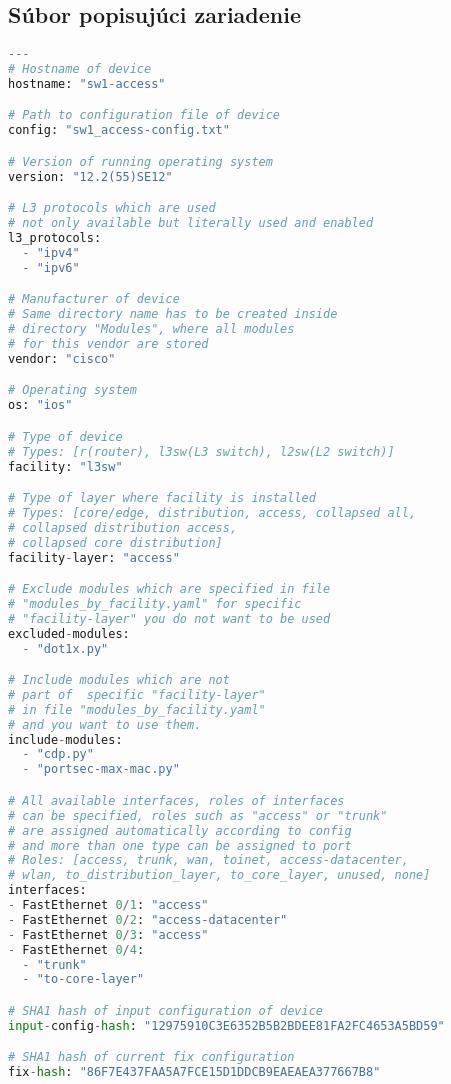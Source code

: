 \subsection{Súbor popisujúci zariadenie}
\begin{lstlisting}[frame=single,numbers=right,caption={Konfiguračný súbor device.yaml, ktorý popisuje základné informácie o~jednom konkrétnom zariadení},label=lst:lldp,basicstyle=\ttfamily\small, keywordstyle=\color{black},language=python,breaklines=true]
---
# Hostname of device
hostname: "sw1-access"

# Path to configuration file of device
config: "sw1_access-config.txt"

# Version of running operating system
version: "12.2(55)SE12"

# L3 protocols which are used 
# not only available but literally used and enabled
l3_protocols:
  - "ipv4"
  - "ipv6"

# Manufacturer of device
# Same directory name has to be created inside 
# directory "Modules", where all modules 
# for this vendor are stored
vendor: "cisco"

# Operating system
os: "ios"

# Type of device
# Types: [r(router), l3sw(L3 switch), l2sw(L2 switch)]
facility: "l3sw"

# Type of layer where facility is installed
# Types: [core/edge, distribution, access, collapsed all, 
# collapsed distribution access, 
# collapsed core distribution]
facility-layer: "access"

# Exclude modules which are specified in file 
# "modules_by_facility.yaml" for specific 
# "facility-layer" you do not want to be used
excluded-modules:
  - "dot1x.py"

# Include modules which are not 
# part of  specific "facility-layer"
# in file "modules_by_facility.yaml" 
# and you want to use them.
include-modules: 
  - "cdp.py"
  - "portsec-max-mac.py"

# All available interfaces, roles of interfaces
# can be specified, roles such as "access" or "trunk"
# are assigned automatically according to config 
# and more than one type can be assigned to port
# Roles: [access, trunk, wan, toinet, access-datacenter,
# wlan, to_distribution_layer, to_core_layer, unused, none]   
interfaces:
- FastEthernet 0/1: "access"
- FastEthernet 0/2: "access-datacenter"
- FastEthernet 0/3: "access"
- FastEthernet 0/4: 
  - "trunk"
  - "to-core-layer"

# SHA1 hash of input configuration of device
input-config-hash: "12975910C3E6352B5B2BDEE81FA2FC4653A5BD59"

# SHA1 hash of current fix configuration 
fix-hash: "86F7E437FAA5A7FCE15D1DDCB9EAEAEA377667B8"

\end{lstlisting}
 \newpage
